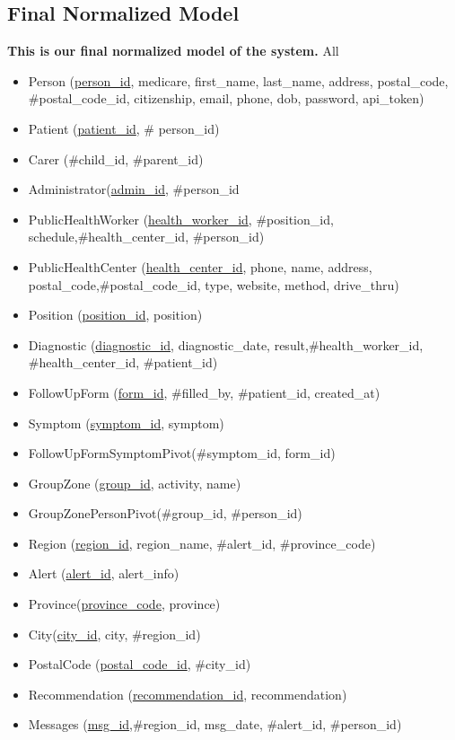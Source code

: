 \subsection{Final Normalized Model}
\begin{tcolorbox}
\textbf{This is our final normalized model of the system.} All
\begin{itemize}
    \item Person (\underline{person\_id}, medicare, first\_name, last\_name, address, postal\_code, \#postal\_code\_id, citizenship, email, phone, dob, password, api\_token)
    \item Patient (\underline{patient\_id}, \# person\_id)
    \item Carer (\#child\_id, \#parent\_id)
    \item Administrator(\underline{admin\_id}, \#person\_id
    \item PublicHealthWorker (\underline{health\_worker\_id}, \#position\_id, schedule,\#health\_center\_id, \#person\_id)
    \item PublicHealthCenter (\underline{health\_center\_id}, phone, name, address, postal\_code,\#postal\_code\_id, type, website, method, drive\_thru)
    \item Position (\underline{position\_id}, position)
    \item Diagnostic (\underline{diagnostic\_id}, diagnostic\_date, result,\#health\_worker\_id, \#health\_center\_id, \#patient\_id)
    \item FollowUpForm (\underline{form\_id}, \#filled\_by, \#patient\_id, created\_at)
    \item Symptom (\underline{symptom\_id}, symptom)
    \item FollowUpFormSymptomPivot(\#symptom\_id, form\_id)
    \item GroupZone (\underline{group\_id}, activity, name)
    \item GroupZonePersonPivot(\#group\_id, \#person\_id)
    \item Region (\underline{region\_id}, region\_name, \#alert\_id, \#province\_code)
    \item Alert (\underline{alert\_id}, alert\_info)
    \item Province(\underline{province\_code}, province)
    \item City(\underline{city\_id}, city, \#region\_id)
    \item PostalCode (\underline{postal\_code\_id}, \#city\_id)
    \item Recommendation (\underline{recommendation\_id}, recommendation)
    \item Messages (\underline{msg\_id},\#region\_id, msg\_date, \#alert\_id, \#person\_id)
    \end{itemize}
    \end{tcolorbox}
\newpage
